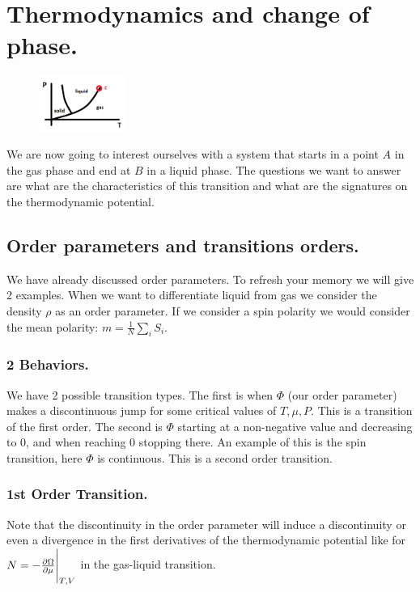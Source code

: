 \documentclass[10pt,a4paper]{book}
\begin{document}
\section{Thermodynamics and change of phase.}
\begin{figure}
    \includegraphics[width=0.25\textwidth]{graphs/critpoint}
\end{figure}
We are now going to interest ourselves with a system that starts in a point $A$ in the gas phase and end at $B$ in a liquid phase. The questions we want to answer are what are the characteristics of this transition and what are the signatures on the thermodynamic potential.

\subsection{Order parameters and transitions orders.}
We have already discussed order parameters. To refresh your memory we will give 2 examples. When we want to differentiate liquid from gas we consider the density $\rho$ as an order parameter. If we consider a spin polarity we would consider the mean polarity: $m = \frac{1}{N}\sum_i S_i$.

\subsubsection{2 Behaviors.}
We have 2 possible transition types. The first is when $\Phi$ (our order parameter) makes a discontinuous jump for some critical values of $T, \mu, P$. This is a transition of the first order. The second is $\Phi$ starting at a non-negative value and decreasing to 0, and when reaching 0 stopping there. An example of this is the spin transition, here $\Phi$ is continuous. This is a second order transition.

\subsubsection{1st Order Transition.}
Note that the discontinuity in the order parameter will induce a discontinuity or even a divergence in the first derivatives of the thermodynamic potential like for $N = -\pdv{\Omega}{\mu}\Bigg|_{T,V}$ in the gas-liquid transition.
\end{document}
